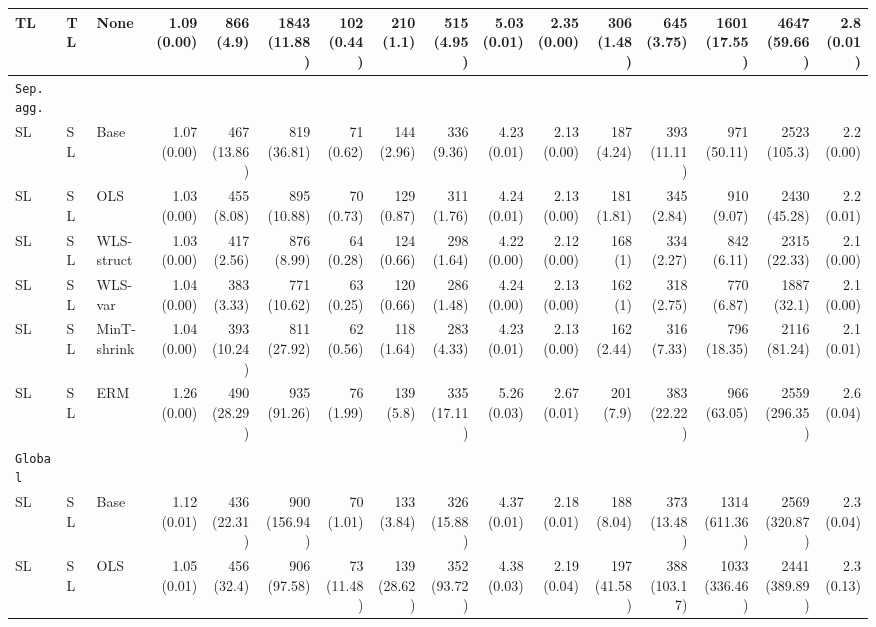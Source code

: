 \documentclass[preprint, 3p, times, twocolumn]{elsarticle}
\begin{document}
\begin{table}
\begin{center}
{{\begin{tabular}{l l l rrrrrrrrrrrrr}
    \hspace{0.1cm} 	TL	&TL	&None	&1.09 (0.00)	&866 (4.9)	&1843 (11.88)	&102 (0.44)	&210 (1.1)	&515 (4.95)	&5.03 (0.01)	&2.35 (0.00)	&306 (1.48)	&645 (3.75)	&1601 (17.55)	&4647 (59.66)	&2.8 (0.01)	\\
    \midrule																	
    \texttt{Sep. agg.}																	\\
    \hspace{0.1cm} 	SL	&SL	&Base	&1.07 (0.00)	&467 (13.86)	&819 (36.81)	&71 (0.62)	&144 (2.96)	&336 (9.36)	&4.23 (0.01)	&2.13 (0.00)	&187 (4.24)	&393 (11.11)	&971 (50.11)	&2523 (105.3)	&2.2 (0.00)	\\
    \hspace{0.1cm} 	SL	&SL	&OLS	&1.03 (0.00)	&455 (8.08)	&895 (10.88)	&70 (0.73)	&129 (0.87)	&311 (1.76)	&4.24 (0.01)	&2.13 (0.00)	&181 (1.81)	&345 (2.84)	&910 (9.07)	&2430 (45.28)	&2.2 (0.01)	\\
    \hspace{0.1cm} 	SL	&SL	&WLS-struct	&1.03 (0.00)	&417 (2.56)	&876 (8.99)	&64 (0.28)	&124 (0.66)	&298 (1.64)	&4.22 (0.00)	&2.12 (0.00)	&168 (1)	&334 (2.27)	&842 (6.11)	&2315 (22.33)	&2.1 (0.00)	\\
    \hspace{0.1cm} 	SL	&SL	&WLS-var	&1.04 (0.00)	&383 (3.33)	&771 (10.62)	&63 (0.25)	&120 (0.66)	&286 (1.48)	&4.24 (0.00)	&2.13 (0.00)	&162 (1)	&318 (2.75)	&770 (6.87)	&1887 (32.1)	&2.1 (0.00)	\\
    \hspace{0.1cm} 	SL	&SL	&MinT-shrink	&1.04 (0.00)	&393 (10.24)	&811 (27.92)	&62 (0.56)	&118 (1.64)	&283 (4.33)	&4.23 (0.01)	&2.13 (0.00)	&162 (2.44)	&316 (7.33)	&796 (18.35)	&2116 (81.24)	&2.1 (0.01)	\\
    \hspace{0.1cm} 	SL	&SL	&ERM	&1.26 (0.00)	&490 (28.29)	&935 (91.26)	&76 (1.99)	&139 (5.8)	&335 (17.11)	&5.26 (0.03)	&2.67 (0.01)	&201 (7.9)	&383 (22.22)	&966 (63.05)	&2559 (296.35)	&2.6 (0.04)	\\
    \midrule																	
    \texttt{Global}																	\\
    \hspace{0.1cm} 	SL	&SL	&Base	&1.12 (0.01)	&436 (22.31)	&900 (156.94)	&70 (1.01)	&133 (3.84)	&326 (15.88)	&4.37 (0.01)	&2.18 (0.01)	&188 (8.04)	&373 (13.48)	&1314 (611.36)	&2569 (320.87)	&2.3 (0.04)	\\
    \hspace{0.1cm} 	SL	&SL	&OLS	&1.05 (0.01)	&456 (32.4)	&906 (97.58)	&73 (11.48)	&139 (28.62)	&352 (93.72)	&4.38 (0.03)	&2.19 (0.04)	&197 (41.58)	&388 (103.17)	&1033 (336.46)	&2441 (389.89)	&2.3 (0.13)	\\

\end{tabular}}}
\end{center}
\end{table}
\end{document}
